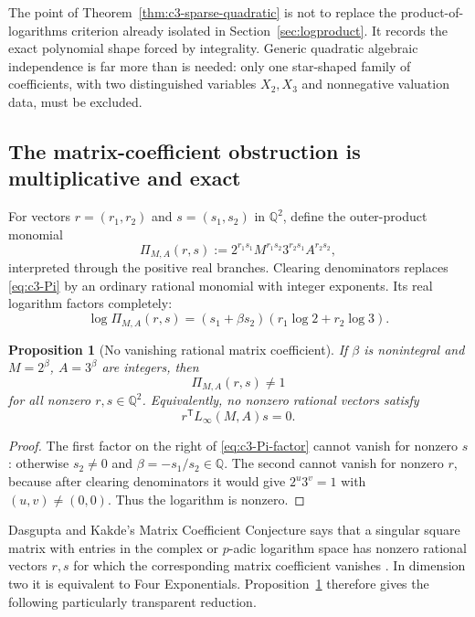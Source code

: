 \documentclass[11pt,oneside]{article}
\newtheorem{proposition}[theorem]{Proposition}
\theoremstyle{definition}
\theoremstyle{remark}
\newcommand{\Q}{\mathbb Q}
\begin{document}
The point of Theorem~\ref{thm:c3-sparse-quadratic} is not to replace the product-of-logarithms
criterion already isolated in Section~\ref{sec:logproduct}.  It records the exact polynomial
shape forced by integrality.  Generic quadratic algebraic independence is far more than is
needed: only one star-shaped family of coefficients, with two distinguished variables
$X_2,X_3$ and nonnegative valuation data, must be excluded.

\subsection{The matrix-coefficient obstruction is multiplicative and exact}
\label{sec:c3-matrix-coefficient}

For vectors $r=(r_1,r_2)$ and $s=(s_1,s_2)$ in $\Q^2$, define the outer-product monomial
\begin{equation}\label{eq:c3-Pi}
 \Pi_{M,A}(r,s)
 :=2^{r_1s_1}M^{r_1s_2}3^{r_2s_1}A^{r_2s_2},
\end{equation}
interpreted through the positive real branches.  Clearing denominators replaces
\eqref{eq:c3-Pi} by an ordinary rational monomial with integer exponents.  Its real logarithm
factors completely:
\begin{equation}\label{eq:c3-Pi-factor}
 \log\Pi_{M,A}(r,s)
  =(s_1+\beta s_2)(r_1\log2+r_2\log3).
\end{equation}

\begin{proposition}[No vanishing rational matrix coefficient]
\label{prop:c3-no-coefficient}
If $\beta$ is nonintegral and $M=2^\beta$, $A=3^\beta$ are integers, then
\[
 \Pi_{M,A}(r,s)\ne1
\]
for all nonzero $r,s\in\Q^2$.  Equivalently, no nonzero rational vectors satisfy
\[
 r^{\mathsf T}L_\infty(M,A)s=0.
\]
\end{proposition}

\begin{proof}
The first factor on the right of \eqref{eq:c3-Pi-factor} cannot vanish for nonzero $s$:
otherwise $s_2\ne0$ and $\beta=-s_1/s_2\in\Q$.  The second cannot vanish for nonzero $r$,
because after clearing denominators it would give $2^u3^v=1$ with $(u,v)\ne(0,0)$.
Thus the logarithm is nonzero.
\end{proof}

Dasgupta and Kakde's Matrix Coefficient Conjecture says that a singular square matrix with
entries in the complex or $p$-adic logarithm space has nonzero rational vectors $r,s$ for
which the corresponding matrix coefficient vanishes \cite{DasguptaKakde2026}.  In dimension
two it is equivalent to Four Exponentials.  Proposition~\ref{prop:c3-no-coefficient} therefore
gives the following particularly transparent reduction.
\end{document}
